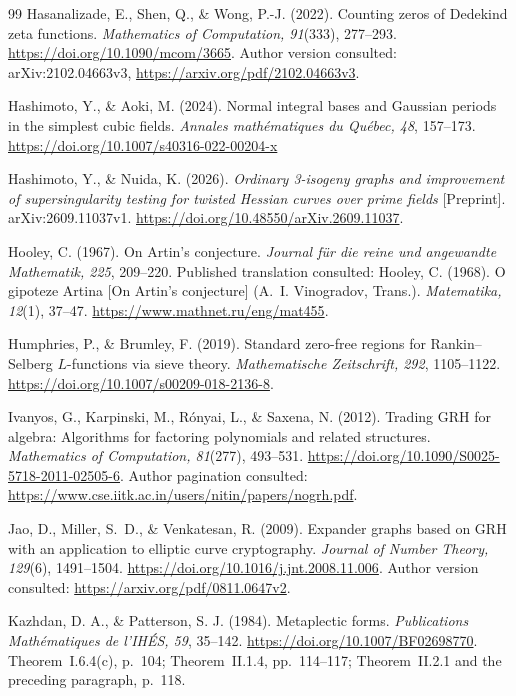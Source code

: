 \documentclass[11pt]{article}
\theoremstyle{definition}
\theoremstyle{remark}
\begin{document}
\begin{thebibliography}{99}
Hasanalizade, E., Shen, Q., \& Wong, P.-J. (2022).
Counting zeros of Dedekind zeta functions.
\emph{Mathematics of Computation, 91}(333), 277--293.
\url{https://doi.org/10.1090/mcom/3665}.
Author version consulted: arXiv:2102.04663v3,
\url{https://arxiv.org/pdf/2102.04663v3}.

Hashimoto, Y., \& Aoki, M. (2024).
Normal integral bases and Gaussian periods in the simplest cubic fields.
\emph{Annales math\'ematiques du Qu\'ebec, 48}, 157--173.
\url{https://doi.org/10.1007/s40316-022-00204-x}

Hashimoto, Y., \& Nuida, K. (2026).
\emph{Ordinary 3-isogeny graphs and improvement of supersingularity
testing for twisted Hessian curves over prime fields} [Preprint].
arXiv:2609.11037v1.
\url{https://doi.org/10.48550/arXiv.2609.11037}.

Hooley, C. (1967). On Artin's conjecture.
\emph{Journal f\"ur die reine und angewandte Mathematik, 225}, 209--220.
Published translation consulted: Hooley, C. (1968).
O gipoteze Artina [On Artin's conjecture] (A.~I. Vinogradov, Trans.).
\emph{Matematika, 12}(1), 37--47.
\url{https://www.mathnet.ru/eng/mat455}.

Humphries, P., \& Brumley, F. (2019).
Standard zero-free regions for Rankin--Selberg $L$-functions via sieve theory.
\emph{Mathematische Zeitschrift, 292}, 1105--1122.
\url{https://doi.org/10.1007/s00209-018-2136-8}.

Ivanyos, G., Karpinski, M., R\'onyai, L., \& Saxena, N. (2012).
Trading GRH for algebra: Algorithms for factoring polynomials and related structures.
\emph{Mathematics of Computation, 81}(277), 493--531.
\url{https://doi.org/10.1090/S0025-5718-2011-02505-6}.
Author pagination consulted:
\url{https://www.cse.iitk.ac.in/users/nitin/papers/nogrh.pdf}.

Jao, D., Miller, S.~D., \& Venkatesan, R. (2009).
Expander graphs based on GRH with an application to elliptic curve cryptography.
\emph{Journal of Number Theory, 129}(6), 1491--1504.
\url{https://doi.org/10.1016/j.jnt.2008.11.006}.
Author version consulted: \url{https://arxiv.org/pdf/0811.0647v2}.

Kazhdan, D. A., \& Patterson, S. J. (1984).
Metaplectic forms.
\emph{Publications Math\'ematiques de l'IH\'ES, 59}, 35--142.
\url{https://doi.org/10.1007/BF02698770}.
Theorem~I.6.4(c), p.~104; Theorem~II.1.4, pp.~114--117;
Theorem~II.2.1 and the preceding paragraph, p.~118.


\end{thebibliography}
\end{document}
